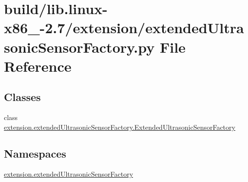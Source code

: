 \hypertarget{build_2lib_8linux-x86__64-2_87_2extension_2extendedUltrasonicSensorFactory_8py}{}\section{build/lib.linux-\/x86\+\_-\/2.7/extension/extended\+Ultrasonic\+Sensor\+Factory.py File Reference}
\label{build_2lib_8linux-x86__64-2_87_2extension_2extendedUltrasonicSensorFactory_8py}
\subsection*{Classes}
\begin{DoxyCompactItemize}
\item 
class \hyperlink{classextension_1_1extendedUltrasonicSensorFactory_1_1ExtendedUltrasonicSensorFactory}{extension.\+extended\+Ultrasonic\+Sensor\+Factory.\+Extended\+Ultrasonic\+Sensor\+Factory}
\end{DoxyCompactItemize}
\subsection*{Namespaces}
\begin{DoxyCompactItemize}
\item 
 \hyperlink{namespaceextension_1_1extendedUltrasonicSensorFactory}{extension.\+extended\+Ultrasonic\+Sensor\+Factory}
\end{DoxyCompactItemize}
